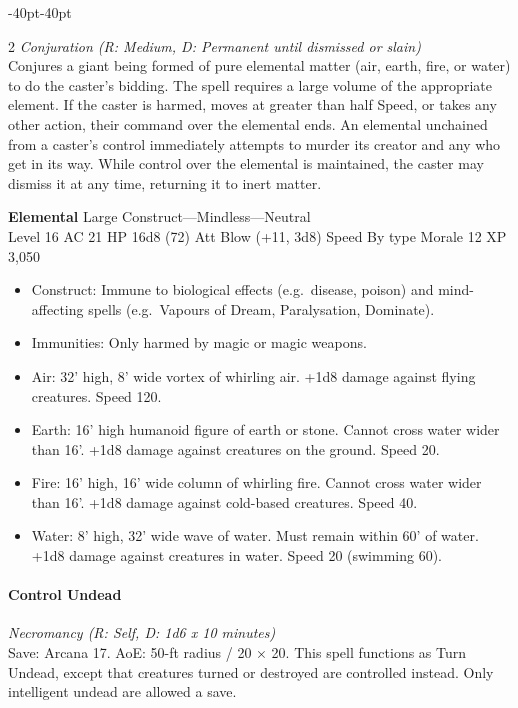 \documentclass{book}
\providecommand{\tightlist}{%
\setlength{\itemsep}{0pt}\setlength{\parskip}{0pt}}
\begin{document}
\begin{adjustwidth}{-40pt}{-40pt}
\begin{multicols}{2}
\emph{Conjuration (R: Medium, D: Permanent until dismissed or slain)}\\
Conjures a giant being formed of pure elemental matter (air, earth,
fire, or water) to do the caster's bidding. The spell requires a large
volume of the appropriate element. If the caster is harmed, moves at
greater than half Speed, or takes any other action, their command over
the elemental ends. An elemental unchained from a caster's control
immediately attempts to murder its creator and any who get in its way.
While control over the elemental is maintained, the caster may dismiss
it at any time, returning it to inert matter.

\textbf{Elemental} Large Construct---Mindless---Neutral\\
Level 16 AC 21 HP 16d8 (72) Att Blow (+11, 3d8) Speed By type Morale 12
XP 3,050

\begin{itemize}
	\tightlist
	\item
	Construct: Immune to biological effects (e.g.~disease, poison) and
	mind-affecting spells (e.g.~Vapours of Dream, Paralysation, Dominate).
	\item
	Immunities: Only harmed by magic or magic weapons.
	\item
	Air: 32' high, 8' wide vortex of whirling air. +1d8 damage against
	flying creatures. Speed 120.
	\item
	Earth: 16' high humanoid figure of earth or stone. Cannot cross water
	wider than 16'. +1d8 damage against creatures on the ground. Speed 20.
	\item
	Fire: 16' high, 16' wide column of whirling fire. Cannot cross water
	wider than 16'. +1d8 damage against cold-based creatures. Speed 40.
	\item
	Water: 8' high, 32' wide wave of water. Must remain within 60' of
	water. +1d8 damage against creatures in water. Speed 20 (swimming 60).
\end{itemize}

\paragraph{Control Undead}\label{control-undead}

\emph{Necromancy (R: Self, D: 1d6 x 10 minutes)}\\
Save: Arcana 17. AoE: 50-ft radius / 20 × 20. This spell functions as
Turn Undead, except that creatures turned or destroyed are controlled
instead. Only intelligent undead are allowed a save.


\end{multicols}
\end{adjustwidth}
\end{document}
